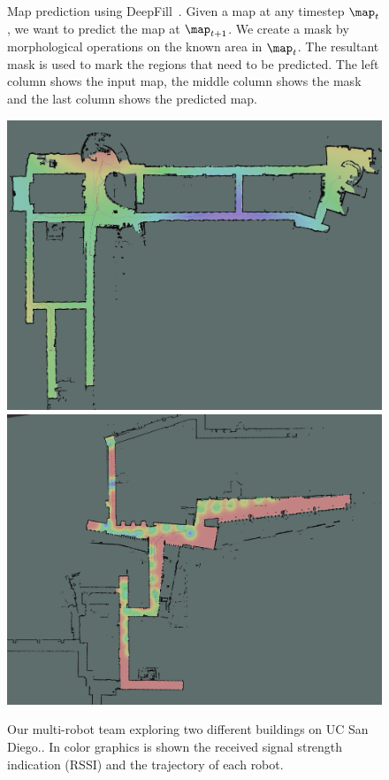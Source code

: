 \begin{figure}[h!]
  \caption{Map prediction using DeepFill~\cite{yu2018DeepFill}. Given a map at
any timestep $\map_{t}$, we want to predict the map at $\map_{t+1}$. We create a
mask by morphological operations on the known area in $\map_t$. The resultant
mask is used to mark the regions that need to be predicted. The left column
shows the input map, the middle column shows the mask and the last column shows
the predicted map.}%
  \label{fig:map-prediction}%
\end{figure}%

\begin{figure}[h!]
 \centering
 \includegraphics[width=.48\linewidth]{./files/media/multirobot_exp.png}%
  \includegraphics[width=.48\linewidth]{./files/media/multirobot_exp2.png}
 \caption{ Our multi-robot team exploring two different buildings on UC San Diego.. In color 
 graphics is shown the received signal strength indication (RSSI) and the trajectory of each robot.}
 \label{fig:multirobot-atk}
\end{figure}